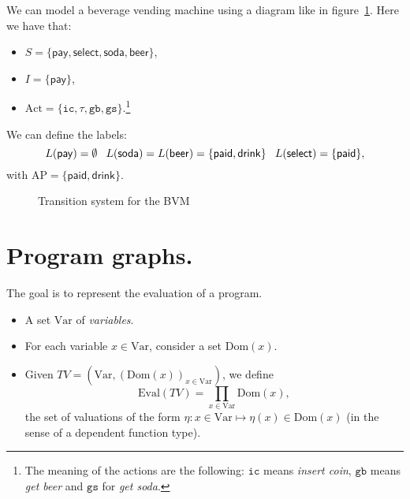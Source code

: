 \documentclass[./main]{subfiles}
\begin{document}
  \begin{exm}
    We can model a beverage vending machine using a diagram like in figure~\ref{fig:bvm-ts}.
    Here we have that:
    \begin{itemize}
      \item $S = \{\mathsf{pay}, \mathsf{select}, \mathsf{soda}, \mathsf{beer}\}$,
      \item $I = \{\mathsf{pay}\}$,
      \item $\mathrm{Act} = \{\mathtt{ic}, \tau, \mathtt{gb}, \mathtt{gs}\}$.\footnote{The meaning of the actions are the following: $\mathtt{ic}$ means \textit{insert coin}, $\mathtt{gb}$ means \textit{get beer} and $\mathtt{gs}$ for \textit{get soda}.}
    \end{itemize}
    We can define the labels:
    \[
    \scriptsize L(\mathsf{pay}) = \emptyset \quad L(\mathsf{soda}) = L(\mathsf{beer}) = \{\mathsf{paid}, \mathsf{drink}\}  \quad L(\mathsf{select}) = \{\mathsf{paid}\}
    ,\]
    with $\mathrm{AP} = \{\mathsf{paid}, \mathsf{drink}\}$.
  \end{exm}
  \begin{figure}
    \centering
    \caption{Transition system for the BVM}
    \label{fig:bvm-ts}
  \end{figure}

  \section{Program graphs.}

  The goal is to represent the evaluation of a program.

  \begin{defn}
    \begin{itemize}
      \item A set $\mathrm{Var}$ of \textit{variables}.
      \item For each variable $x \in \mathrm{Var}$, consider a set $\mathrm{Dom}(x)$.
      \item Given $TV = (\mathrm{Var}, (\mathrm{Dom}(x))_{x \in \mathrm{Var}})$, we define
        \[
          \mathrm{Eval}(TV) = \prod_{x \in \mathrm{Var}} \mathrm{Dom}(x)
        ,\]
        the set of valuations of the form $\eta : x \in \mathrm{Var} \mapsto \eta(x) \in \mathrm{Dom}(x)$ (in the sense of a dependent function type).
    \end{itemize}
  \end{defn}
\end{document}
